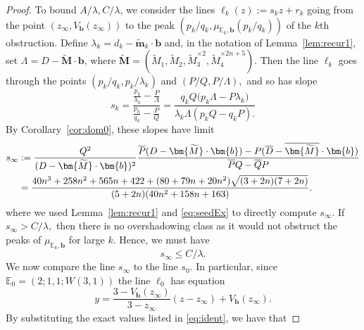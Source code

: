 \documentclass[11pt, reqno]{amsart}
\theoremstyle{remark}
\numberwithin{equation}{subsection}
\numberwithin{figure}{section}
\theoremstyle{customremark}
\newcommand{\bE}{{\mathbb E}}
\newcommand{\ov}{\overline}
\newcommand{\la}{{\lambda}}
\newcommand{\comm}[1]{\marginpar{\tiny #1 }}
\newcommand{\btm}{\widetilde{\bm{m}}}
\begin{document}
\begin{proof}
To bound $A/\la,C/\la$, we consider the lines $\ell_k(z):=s_k z+r_k$ going from the point $(z_\infty,V_{\bm{b}}(z_\infty))$ to the peak $(p_k/q_k,\mu_{\bE_k,\bm{b}}(p_k/q_k))$ of the $k$th obstruction.  
Define $\la_k=d_k-\btm_k \cdot \bm{b}$ and, in the notation of Lemma~\ref{lem:recur1}, set
$\Lambda=D-\widetilde{\bm{M}} \cdot \bm{b}$, where $\bm{\widetilde{M}}=(\widetilde{M}_1,\widetilde{M}_2,\widetilde{M}_3^{\times 2},\widetilde{M}_4^{\times 2n+5})$. Then 
 the line $\ell_k$ goes through the points $(p_k/q_k,p_k/\la_k)$ and $(P/Q,P/\Lambda),$ and so has  slope %
\[ s_k=\frac{
\frac{p_k}{\lambda_k}-\frac{P}{\Lambda}
}{
\frac{p_k}{q_k}-\frac{P}{Q}
}
=
\frac{
q_kQ\bigl(p_k\Lambda-P\lambda_k\bigr)
}{
\lambda_k\Lambda(p_kQ-q_kP).
}
\]
By Corollary~\ref{cor:dom0}, these slopes have limit
\begin{align}
    s_\infty&:=\frac{Q^2}{(D-\bm{\widetilde{M}}\cdot \bm{b})^2}\frac{\ov{P}(D-\bm{\widetilde{M}}\cdot \bm{b})-P(\ov{D}-\ov{\bm{\widetilde{M}}} \cdot \bm{b})
    }{\ov{P}Q-\ov{Q}P} \notag \\
    &=\frac{40n^3+258n^2+565n+422+(80+79n+20n^2)\sqrt{(3+2n)(7+2n)}}{(5+2n)(40n^2+158n+163)} \label{eq:sInf}.
\end{align}
where we used Lemma~\ref{lem:recur1} and 
\eqref{eq:seedEx} to directly compute $s_\infty$. 
If $s_\infty>C/\la,$ then there is no overshadowing class as it would not obstruct the peaks of $\mu_{\bE_k,\bm{b}}$ for large $k.$ Hence, we must have 
\[ s_\infty  \leq C/\la.\]
We now compare the line $s_\infty$ to the line $s_0.$ In particular, since $\bE_0 = (2;1,1; W(3,1))$ the line $\ell_0$ has equation
\[
y = \frac{3-V_{\bm{b}}(z_\infty)}{3-z_\infty}(z-z_\infty)+V_{\bm{b}}(z_\infty).\]
 By substituting the exact values listed in  \eqref{eq:ident}, we have that 

\end{proof}
\end{document}
